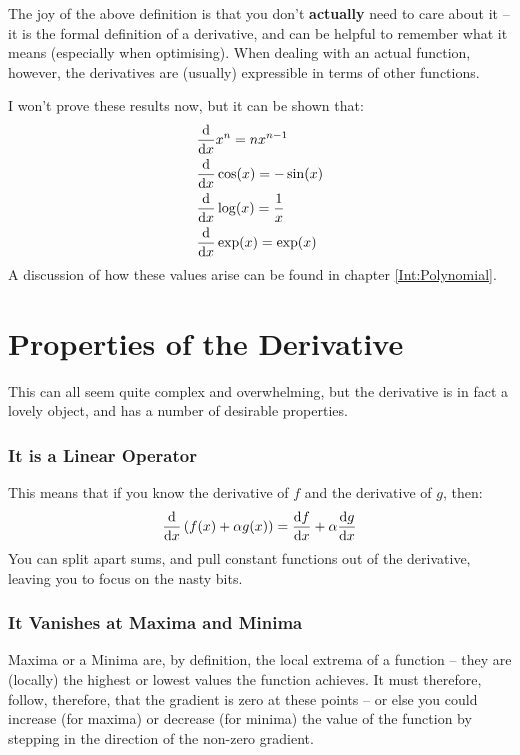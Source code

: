 \documentclass[a4paper,openany,11pt]{book}
\begin{document}
						The joy of the above definition is that you don't \textbf{actually} need to care about it -- it is the formal definition of a derivative, and can be helpful to remember what it means (especially when optimising). When dealing with an actual function, however, the derivatives are (usually) expressible in terms of other functions. 

						I won't prove these results now, but it can be shown that:
						\begin{align}
							\frac{\mathrm d}{\mathrm d x} & x^n  = n x^{n-1}
							\\
							\frac{\mathrm d}{\mathrm d x} & \cos(x)  = - \sin(x)
							\\
							\frac{\mathrm d}{\mathrm d x} & \log(x)  = \frac{1}{x}
							\\
							\frac{\mathrm d }{\mathrm d x} & \exp(x) = \exp(x)
						\end{align}
						A discussion of how these values arise can be found in chapter \ref{Int:Polynomial}.

				\section{Properties of the Derivative}

					This can all seem quite complex and overwhelming, but the derivative is in fact a lovely object, and has a number of desirable properties.

					\subsubsection{It is a Linear Operator}

						This means that if you know the derivative of $f$ and the derivative of $g$, then:
						\begin{equation}
							\frac{\mathrm d}{\mathrm d x} \left(f(x) + \alpha g(x) \right) = \frac{\mathrm d f}{\mathrm d x} + \alpha \frac{\mathrm d g}{\mathrm d x}
						\end{equation}
						You can split apart sums, and pull constant functions out of the derivative, leaving you to focus on the nasty bits. 

					\subsubsection{It Vanishes at Maxima and Minima}

						Maxima or a Minima are, by definition, the local extrema of a function -- they are (locally) the highest or lowest values the function achieves. It must therefore, follow, therefore, that the gradient is zero at these points -- or else you could increase (for maxima) or decrease (for minima) the value of the function by stepping in the direction of the non-zero gradient. 
\end{document}
